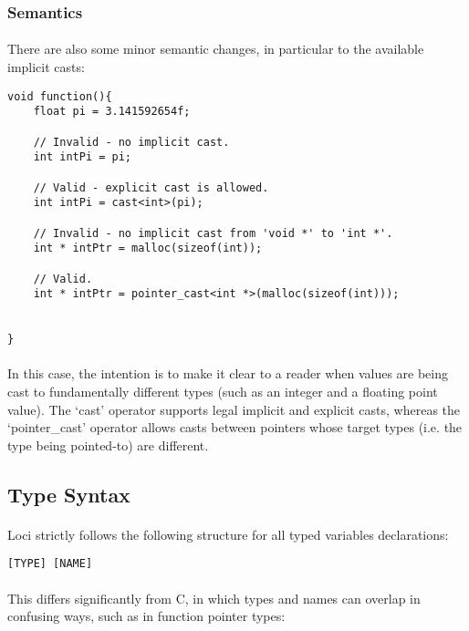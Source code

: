 \documentclass[12pt,twoside,notitlepage]{report}
\begin{document}
\subsubsection{Semantics}

\paragraph{}
There are also some minor semantic changes, in particular to the available implicit casts:


\begin{lstlisting}
void function(){
	float pi = 3.141592654f;
	
	// Invalid - no implicit cast.
	int intPi = pi;
	
	// Valid - explicit cast is allowed.
	int intPi = cast<int>(pi);
	
	// Invalid - no implicit cast from 'void *' to 'int *'.
	int * intPtr = malloc(sizeof(int));
	
	// Valid.
	int * intPtr = pointer_cast<int *>(malloc(sizeof(int)));
	
	
}
\end{lstlisting}


\paragraph{}
In this case, the intention is to make it clear to a reader when values are being cast to fundamentally different types (such as an integer and a floating point value). The `cast' operator supports legal implicit and explicit casts, whereas the `pointer\_cast' operator allows casts between pointers whose target types (i.e. the type being pointed-to) are different.

\clearpage

\subsection{Type Syntax}

\paragraph{}
Loci strictly follows the following structure for all typed variables declarations:


\begin{lstlisting}
[TYPE] [NAME]
\end{lstlisting}


\paragraph{}
This differs significantly from C, in which types and names can overlap in confusing ways, such as in function pointer types:
\end{document}
